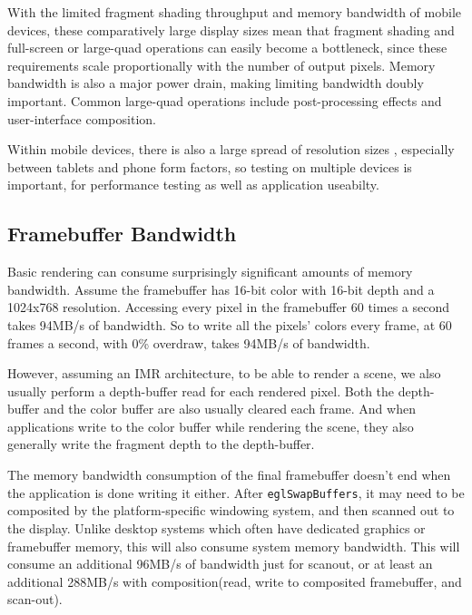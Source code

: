 
With the limited fragment shading throughput and memory bandwidth of mobile
devices, these comparatively large display sizes mean that fragment shading and
full-screen or large-quad operations can easily become a bottleneck, since
these requirements scale proportionally with the number of output pixels.
Memory bandwidth is also a major power drain, making limiting bandwidth doubly
important.  Common large-quad operations include post-processing effects and user-interface composition.

Within mobile devices, there is also a large spread of resolution sizes
, especially between tablets and phone form factors, so testing
on multiple devices is important, for performance testing as well as
application useabilty.

\subsection{Framebuffer Bandwidth}\label{Jon-McCaffrey-Framebuffer-Bandwidth}

Basic rendering can consume surprisingly significant amounts of memory
bandwidth.  Assume the framebuffer has 16-bit color with 16-bit depth
\cite{Google11} and a 1024x768 resolution.  Accessing every pixel in the
framebuffer 60 times a second takes 94MB/s of bandwidth.  So to write all the
pixels' colors every frame, at 60 frames a second, with 0\%
overdraw, takes 94MB/s of bandwidth.

 

However, assuming an IMR architecture, to be able to render a scene, we also
usually perform a depth-buffer read for each rendered pixel.  Both the
depth-buffer and the color buffer are also usually cleared each frame.  And
when applications write to the color buffer while rendering the scene, they
also generally write the fragment depth to the depth-buffer.

The memory bandwidth consumption of the final framebuffer doesn't end when the
application is done writing it either.  After \texttt{eglSwapBuffers}, it may
need to be composited by the platform-specific windowing system, and then
scanned out to the display.  Unlike desktop systems which often have
dedicated graphics or framebuffer memory, this will also consume system memory
bandwidth.  This will consume an additional 96MB/s of bandwidth just for
scanout, or at least an additional 288MB/s with composition(read, write to
composited framebuffer, and scan-out).

